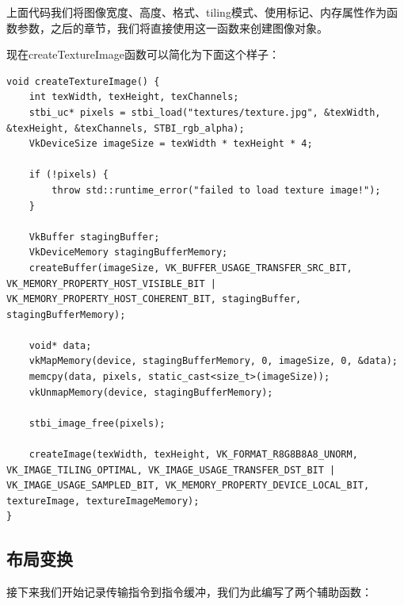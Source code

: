 \documentclass{ctexart}
\begin{document}
上面代码我们将图像宽度、高度、格式、tiling模式、使用标记、内存属性作为函数参数，之后的章节，我们将直接使用这一函数来创建图像对象。

现在createTextureImage函数可以简化为下面这个样子：

\begin{lstlisting}[language={[ANSI]C}]
void createTextureImage() {
	int texWidth, texHeight, texChannels;
	stbi_uc* pixels = stbi_load("textures/texture.jpg", &texWidth, &texHeight, &texChannels, STBI_rgb_alpha);
	VkDeviceSize imageSize = texWidth * texHeight * 4;

	if (!pixels) {
		throw std::runtime_error("failed to load texture image!");
	}

	VkBuffer stagingBuffer;
	VkDeviceMemory stagingBufferMemory;
	createBuffer(imageSize, VK_BUFFER_USAGE_TRANSFER_SRC_BIT, VK_MEMORY_PROPERTY_HOST_VISIBLE_BIT | VK_MEMORY_PROPERTY_HOST_COHERENT_BIT, stagingBuffer, stagingBufferMemory);

	void* data;
	vkMapMemory(device, stagingBufferMemory, 0, imageSize, 0, &data);
	memcpy(data, pixels, static_cast<size_t>(imageSize));
	vkUnmapMemory(device, stagingBufferMemory);

	stbi_image_free(pixels);

	createImage(texWidth, texHeight, VK_FORMAT_R8G8B8A8_UNORM, VK_IMAGE_TILING_OPTIMAL, VK_IMAGE_USAGE_TRANSFER_DST_BIT | VK_IMAGE_USAGE_SAMPLED_BIT, VK_MEMORY_PROPERTY_DEVICE_LOCAL_BIT, textureImage, textureImageMemory);
}
\end{lstlisting}

\subsection{布局变换}

接下来我们开始记录传输指令到指令缓冲，我们为此编写了两个辅助函数：
\end{document}
